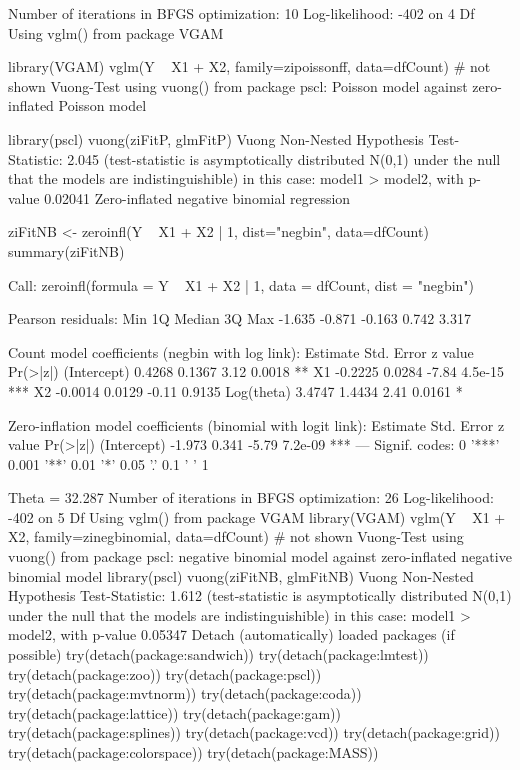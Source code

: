 Number of iterations in BFGS optimization: 10 
Log-likelihood: -402 on 4 Df
Using vglm() from package VGAM


library(VGAM)
vglm(Y ~ X1 + X2, family=zipoissonff, data=dfCount)
# not shown
Vuong-Test using vuong() from package pscl: Poisson model against zero-inflated Poisson model

library(pscl)
vuong(ziFitP, glmFitP)
Vuong Non-Nested Hypothesis Test-Statistic: 2.045 
(test-statistic is asymptotically distributed N(0,1) under the
 null that the models are indistinguishible)
in this case:
model1 > model2, with p-value 0.02041 
Zero-inflated negative binomial regression

ziFitNB <- zeroinfl(Y ~ X1 + X2 | 1, dist="negbin", data=dfCount)
summary(ziFitNB)

Call:
zeroinfl(formula = Y ~ X1 + X2 | 1, data = dfCount, dist = "negbin")

Pearson residuals:
   Min     1Q Median     3Q    Max 
-1.635 -0.871 -0.163  0.742  3.317 

Count model coefficients (negbin with log link):
            Estimate Std. Error z value Pr(>|z|)    
(Intercept)   0.4268     0.1367    3.12   0.0018 ** 
X1           -0.2225     0.0284   -7.84  4.5e-15 ***
X2           -0.0014     0.0129   -0.11   0.9135    
Log(theta)    3.4747     1.4434    2.41   0.0161 *  

Zero-inflation model coefficients (binomial with logit link):
            Estimate Std. Error z value Pr(>|z|)    
(Intercept)   -1.973      0.341   -5.79  7.2e-09 ***
---
Signif. codes:  0 '***' 0.001 '**' 0.01 '*' 0.05 '.' 0.1 ' ' 1 

Theta = 32.287 
Number of iterations in BFGS optimization: 26 
Log-likelihood: -402 on 5 Df
Using vglm() from package VGAM
library(VGAM)
vglm(Y ~ X1 + X2, family=zinegbinomial, data=dfCount)
# not shown
Vuong-Test using vuong() from package pscl: negative binomial model against zero-inflated negative binomial model
library(pscl)
vuong(ziFitNB, glmFitNB)
Vuong Non-Nested Hypothesis Test-Statistic: 1.612 
(test-statistic is asymptotically distributed N(0,1) under the
 null that the models are indistinguishible)
in this case:
model1 > model2, with p-value 0.05347 
Detach (automatically) loaded packages (if possible)
try(detach(package:sandwich))
try(detach(package:lmtest))
try(detach(package:zoo))
try(detach(package:pscl))
try(detach(package:mvtnorm))
try(detach(package:coda))
try(detach(package:lattice))
try(detach(package:gam))
try(detach(package:splines))
try(detach(package:vcd))
try(detach(package:grid))
try(detach(package:colorspace))
try(detach(package:MASS))
